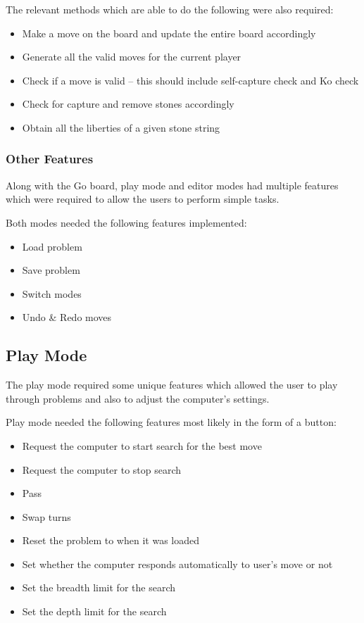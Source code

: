 \documentclass{l4proj}
\begin{document}
The relevant methods which are able to do the following were also required:
\begin{itemize}
\item Make a move on the board and update the entire board accordingly
\item Generate all the valid moves for the current player
\item Check if a move is valid – this should include self-capture check and Ko check
\item Check for capture and remove stones accordingly
\item Obtain all the liberties of a given stone string
\end{itemize}

\subsubsection{Other Features}
Along with the Go board, play mode and editor modes had multiple features which were required to allow the users to perform simple tasks.

Both modes needed the following features implemented:
\begin{itemize}
\item Load problem
\item Save problem
\item Switch modes
\item Undo \& Redo moves
\end{itemize}

\subsection{Play Mode}
The play mode required some unique features which allowed the user to play through problems and also to adjust the computer’s settings.

Play mode needed the following features most likely in the form of a button:
\begin{itemize}
\item Request the computer to start search for the best move
\item Request the computer to stop search
\item Pass
\item Swap turns
\item Reset the problem to when it was loaded
\item Set whether the computer responds automatically to user’s move or not
\item Set the breadth limit for the search
\item Set the depth limit for the search
\end{itemize}
\end{document}
